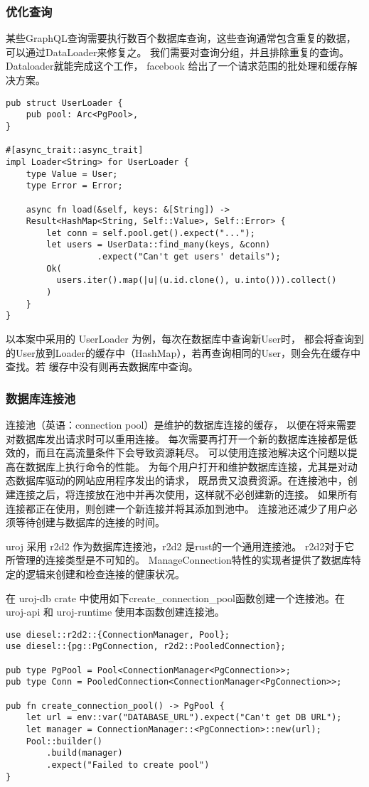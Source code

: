 \subsubsection{优化查询}
某些GraphQL查询需要执行数百个数据库查询，这些查询通常包含重复的数据，可以通过DataLoader来修复之。
我们需要对查询分组，并且排除重复的查询。Dataloader就能完成这个工作，
facebook 给出了一个请求范围的批处理和缓存解决方案。
\begin{lstlisting}
pub struct UserLoader {
    pub pool: Arc<PgPool>,
}

#[async_trait::async_trait]
impl Loader<String> for UserLoader {
    type Value = User;
    type Error = Error;

    async fn load(&self, keys: &[String]) -> 
    Result<HashMap<String, Self::Value>, Self::Error> {
        let conn = self.pool.get().expect("...");
        let users = UserData::find_many(keys, &conn)
                  .expect("Can't get users' details");
        Ok(
          users.iter().map(|u|(u.id.clone(), u.into())).collect()
        )
    }
}
\end{lstlisting}

以本案中采用的 UserLoader 为例，每次在数据库中查询新User时，
都会将查询到的User放到Loader的缓存中（HashMap），若再查询相同的User，则会先在缓存中查找。若
缓存中没有则再去数据库中查询。

\subsubsection{数据库连接池}
连接池（英语：connection pool）是维护的数据库连接的缓存，
以便在将来需要对数据库发出请求时可以重用连接。
每次需要再打开一个新的数据库连接都是低效的，而且在高流量条件下会导致资源耗尽。
可以使用连接池解决这个问题以提高在数据库上执行命令的性能。
为每个用户打开和维护数据库连接，尤其是对动态数据库驱动的网站应用程序发出的请求，
既昂贵又浪费资源。在连接池中，创建连接之后，将连接放在池中并再次使用，这样就不必创建新的连接。
如果所有连接都正在使用，则创建一个新连接并将其添加到池中。
连接池还减少了用户必须等待创建与数据库的连接的时间。

uroj 采用 r2d2 作为数据库连接池，r2d2 是rust的一个通用连接池。
r2d2对于它所管理的连接类型是不可知的。
ManageConnection特性的实现者提供了数据库特定的逻辑来创建和检查连接的健康状况。

在 uroj-db crate 中使用如下create\_connection\_pool函数创建一个连接池。在
uroj-api 和 uroj-runtime 使用本函数创建连接池。
\begin{lstlisting}
use diesel::r2d2::{ConnectionManager, Pool};
use diesel::{pg::PgConnection, r2d2::PooledConnection};

pub type PgPool = Pool<ConnectionManager<PgConnection>>;
pub type Conn = PooledConnection<ConnectionManager<PgConnection>>;

pub fn create_connection_pool() -> PgPool {
    let url = env::var("DATABASE_URL").expect("Can't get DB URL");
    let manager = ConnectionManager::<PgConnection>::new(url);
    Pool::builder()
        .build(manager)
        .expect("Failed to create pool")
}
\end{lstlisting}
